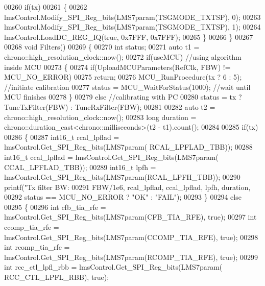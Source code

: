 \begin{DoxyCode}
{{00260     \textcolor{keywordflow}{if}(tx)
00261     \{
00262         lmsControl.Modify_SPI_Reg_bits(LMS7param(TSGMODE_TXTSP), 0);
00263         lmsControl.Modify_SPI_Reg_bits(LMS7param(TSGMODE_TXTSP), 1);
00264         lmsControl.LoadDC_REG_IQ(\textcolor{keyword}{true}, 0x7FFF, 0x7FFF);
00265     \}
00266 \}
00267 
00268 \textcolor{keywordtype}{void} Filters()
00269 \{
00270     \textcolor{keywordtype}{int} status;
00271     \textcolor{keyword}{auto} t1 = chrono::high\_resolution\_clock::now();
00272     \textcolor{keywordflow}{if}(useMCU) \textcolor{comment}{//using algorithm inside MCU}
00273     \{
00274         \textcolor{keywordflow}{if}(UploadMCUParameters(RefClk, FBW) != MCU_NO_ERROR)
00275             \textcolor{keywordflow}{return};
00276         MCU_RunProcedure(tx ? 6 : 5); \textcolor{comment}{//initiate calibration}
00277         status = MCU_WaitForStatus(1000); \textcolor{comment}{//wait until MCU finishes}
00278     \}
00279     \textcolor{keywordflow}{else} \textcolor{comment}{//calibrating with PC}
00280         status = tx ? TuneTxFilter(FBW) : TuneRxFilter(FBW);
00281 
00282     \textcolor{keyword}{auto} t2 = chrono::high\_resolution\_clock::now();
00283     \textcolor{keywordtype}{long} duration = chrono::duration\_cast<chrono::milliseconds>(t2 - t1).count();
00284 
00285     \textcolor{keywordflow}{if}(tx)
00286     \{
00287         int16\_t rcal\_lpflad = lmsControl.Get_SPI_Reg_bits(LMS7param(
      RCAL_LPFLAD_TBB));
00288         int16\_t ccal\_lpflad = lmsControl.Get_SPI_Reg_bits(LMS7param(
      CCAL_LPFLAD_TBB));
00289         int16\_t lpfh = lmsControl.Get_SPI_Reg_bits(LMS7param(RCAL_LPFH_TBB));
00290         printf(\textcolor{stringliteral}{"Tx filter BW: %
00291                 FBW/1e6, rcal\_lpflad, ccal\_lpflad, lpfh, duration,
00292                 status == MCU_NO_ERROR ? \textcolor{stringliteral}{"OK"} : \textcolor{stringliteral}{"FAIL"});
00293     \}
00294     \textcolor{keywordflow}{else}
00295     \{
00296         \textcolor{keywordtype}{int} cfb\_tia\_rfe = lmsControl.Get_SPI_Reg_bits(LMS7param(CFB_TIA_RFE), \textcolor{keyword}{true});
00297         \textcolor{keywordtype}{int} ccomp\_tia\_rfe = lmsControl.Get_SPI_Reg_bits(LMS7param(CCOMP_TIA_RFE), \textcolor{keyword}{true});
00298         \textcolor{keywordtype}{int} rcomp\_tia\_rfe = lmsControl.Get_SPI_Reg_bits(LMS7param(RCOMP_TIA_RFE), \textcolor{keyword}{true});
00299         \textcolor{keywordtype}{int} rcc\_ctl\_lpfl\_rbb = lmsControl.Get_SPI_Reg_bits(LMS7param(
      RCC_CTL_LPFL_RBB), \textcolor{keyword}{true});
}}}
\end{DoxyCode}
